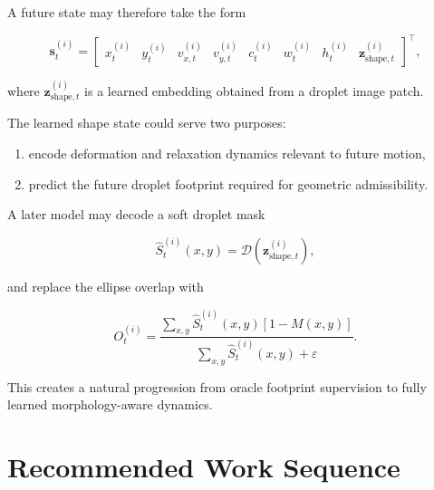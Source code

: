 \documentclass[11pt]{article}
\begin{document}
A future state may therefore take the form

\begin{equation}
    \bm{s}_{t}^{(i)}
    =
    \begin{bmatrix}
        x_t^{(i)} &
        y_t^{(i)} &
        v_{x,t}^{(i)} &
        v_{y,t}^{(i)} &
        c_t^{(i)} &
        w_t^{(i)} &
        h_t^{(i)} &
        \bm{z}_{\mathrm{shape},t}^{(i)}
    \end{bmatrix}^{\!\top},
\end{equation}

where $\bm{z}_{\mathrm{shape},t}^{(i)}$ is a learned embedding obtained from a droplet image patch.

The learned shape state could serve two purposes:

\begin{enumerate}[leftmargin=1.8em]
    \item encode deformation and relaxation dynamics relevant to future motion,
    \item predict the future droplet footprint required for geometric admissibility.
\end{enumerate}

A later model may decode a soft droplet mask

\begin{equation}
    \widehat{S}_{t}^{(i)}(x,y)
    =
    \mathcal{D}
    \left(
    \bm{z}_{\mathrm{shape},t}^{(i)}
    \right),
\end{equation}

and replace the ellipse overlap with

\begin{equation}
    O_{t}^{(i)}
    =
    \frac{
    \sum_{x,y}
    \widehat{S}_{t}^{(i)}(x,y)
    \left[
    1-M(x,y)
    \right]
    }{
    \sum_{x,y}
    \widehat{S}_{t}^{(i)}(x,y)
    +\varepsilon
    }.
\end{equation}

This creates a natural progression from oracle footprint supervision to fully learned morphology-aware dynamics.

\section{Recommended Work Sequence}
\end{document}
